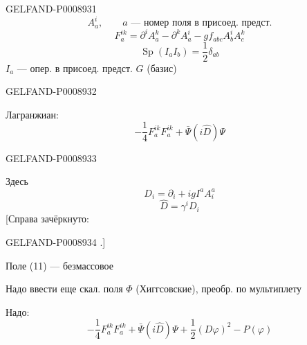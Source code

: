 \begin{GelfandAdjacentEvidence}{GELFAND-P000893}{1}
\begin{equation*}
A_a^i,\qquad a\text{ — номер поля в присоед. предст.} \tag{8}
\end{equation*}
\begin{equation*}
F_a^{ik}=\partial^i A_a^k-\partial^k A_a^i-gf_{abc}A_b^iA_c^k \tag{9}
\end{equation*}
\begin{equation*}
\operatorname{Sp}(I_aI_b)=\frac12\delta_{ab} \tag{10}
\end{equation*}
$I_a$ — опер. в присоед. предст. $G$ (базис)
\end{GelfandAdjacentEvidence}
\begin{GelfandAdjacentEvidence}{GELFAND-P000893}{2}


Лагранжиан:
\begin{equation*}
-\frac14 F_a^{ik}F_a^{ik}+\bar\Psi(i\hat D)\Psi \tag{11}
\end{equation*}
\end{GelfandAdjacentEvidence}
\begin{GelfandAdjacentEvidence}{GELFAND-P000893}{3}


Здесь
\begin{equation*}
D_i=\partial_i+igI^aA_i^a \tag{12}
\end{equation*}
\begin{equation*}
\hat D=\gamma^iD_i \tag*{$(12)_2$}
\end{equation*}
[Справа зачёркнуто: 
\end{GelfandAdjacentEvidence}
\begin{GelfandAdjacentEvidence}{GELFAND-P000893}{4}
.]

Поле (11) — безмассовое

Надо ввести еще скал. поля $\Phi$ (Хиггсовские), преобр. по мультиплету

Надо:
\begin{equation*}
-\frac14 F_a^{ik}F_a^{ik}+\bar\Psi(i\hat D)\Psi
+\frac12(D\varphi)^2-P(\varphi) \tag{13}
\end{equation*}
\end{GelfandAdjacentEvidence}
